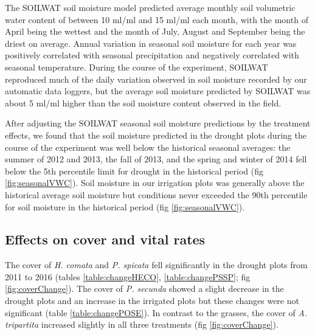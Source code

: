 \documentclass[11pt]{article}
\begin{document}
\begin{doublespace}
The SOILWAT soil moisture model predicted average monthly soil volumetric water content of between 10 ml/ml and 15 ml/ml each month, with the month of April being the wettest and the month of July, August and September being the driest on average. Annual variation in seasonal soil moisture for each year was positively correlated with seasonal precipitation and negatively correlated with seasonal temperature. During the course of the experiment, SOILWAT reproduced much of the daily variation observed in soil moisture recorded by our automatic data loggers, but the average soil moisture predicted by SOILWAT was about 5 ml/ml higher than the soil moisture content observed in the field.  

After adjusting the SOILWAT seasonal soil moisture predictions by the treatment effects, we found that the soil moisture predicted in the drought plots during the course of the experiment was well below the historical seasonal averages: the summer of 2012 and 2013, the fall of 2013, and the spring and winter of 2014 fell below the 5th percentile limit for drought in the historical period (fig \ref{fig:seasonalVWC}). Soil moisture in our irrigation plots was generally above the historical average soil moisture but conditions never exceeded the 90th percentile for soil moisture in the historical period (fig \ref{fig:seasonalVWC}). 

\subsection*{Effects on cover and vital rates}

The cover of \textit{H. comata} and \textit{P. spicata} fell significantly in the drought plots from 2011 to 2016 (tables \ref{table:changeHECO}, \ref{table:changePSSP}; fig \ref{fig:coverChange}). The cover of \textit{P. secunda} showed a slight decrease in the drought plots and an increase in the irrigated plots but these changes were not significant (table \ref{table:changePOSE}).  In contrast to the grasses, the cover of \textit{A. tripartita} increased slightly in all three treatments (fig \ref{fig:coverChange}). 


\end{doublespace}
\end{document}
